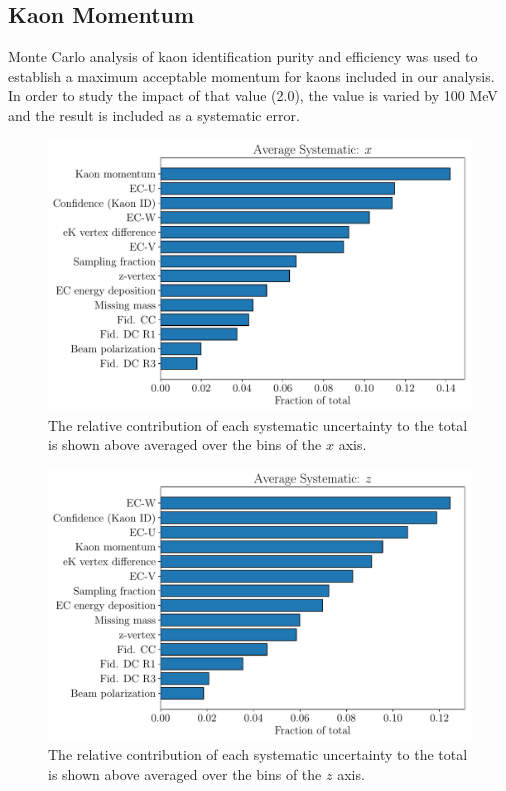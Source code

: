 \subsection{Kaon Momentum}
Monte Carlo analysis of kaon identification purity and efficiency was used to establish a maximum acceptable momentum for kaons included in our analysis.  In order to study the impact of that value (2.0), the value is varied by 100 MeV and the result is included as a systematic error.  

\begin{figure}
	\centering
	\includegraphics[width=16cm]{image/plots/kaon-bsa/bar-systematics-x.pdf}
	\caption{The relative contribution of each systematic uncertainty to the total is shown above averaged over the bins of the $x$ axis.}
\end{figure}

\begin{figure}
	\centering
	\includegraphics[width=16cm]{image/plots/kaon-bsa/bar-systematics-z.pdf}
	\caption{The relative contribution of each systematic uncertainty to the total is shown above averaged over the bins of the $z$ axis.}
\end{figure}

